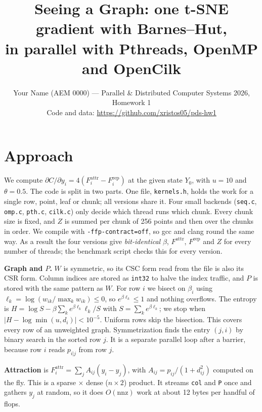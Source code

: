 \documentclass[11pt,a4paper]{article}
\title{\vspace{-1.2cm}Seeing a Graph: one t-SNE gradient with Barnes--Hut,\\in parallel with Pthreads, OpenMP and OpenCilk}
\author{Your Name (AEM 0000) --- Parallel \& Distributed Computer Systems 2026, Homework 1\\
\small Code and data: \url{https://github.com/xristos05/pds-hw1}}
\date{\vspace{-0.9cm}}
\newcommand{\code}[1]{\texttt{#1}}
\begin{document}
\maketitle

\section{Approach}

We compute $\partial C/\partial y_i = 4(F^{\mathrm{attr}}_i - F^{\mathrm{rep}}_i)$ at the given state $Y_0$, with $u=10$ and $\theta=0.5$.
The code is split in two parts. One file, \code{kernels.h}, holds the work for a single row, point, leaf or chunk; all versions share it.
Four small backends (\code{seq.c}, \code{omp.c}, \code{pth.c}, \code{cilk.c}) only decide which thread runs which chunk.
Every chunk size is fixed, and $Z$ is summed per chunk of 256 points and then over the chunks in order.
We compile with \code{-ffp-contract=off}, so gcc and clang round the same way.
As a result the four versions give \emph{bit-identical} $\beta$, $F^{\mathrm{attr}}$, $F^{\mathrm{rep}}$ and $Z$ for every number of threads; the benchmark script checks this for every version.

\textbf{Graph and $P$.} $W$ is symmetric, so its CSC form read from the file is also its CSR form. Column indices are stored as \code{int32} to halve the index traffic, and $P$ is stored with the same pattern as $W$.
For row $i$ we bisect on $\beta_i$ using $\ell_k=\log(w_{ik}/\max_k w_{ik})\le 0$, so $e^{\beta\ell_k}\le1$ and nothing overflows. The entropy is $H=\log S-\beta\sum_k e^{\beta\ell_k}\ell_k/S$ with $S=\sum_k e^{\beta\ell_k}$; we stop when $|H-\log\min(u,d_i)|<10^{-5}$.
Uniform rows skip the bisection. This covers every row of an unweighted graph.
Symmetrization finds the entry $(j,i)$ by binary search in the sorted row $j$. It is a separate parallel loop after a barrier, because row $i$ reads $p_{i|j}$ from row $j$.

\textbf{Attraction} is $F^{\mathrm{attr}}_i=\sum_j A_{ij}(y_i-y_j)$, with $A_{ij}=p_{ij}/(1+d_{ij}^2)$ computed on the fly. This is a sparse $\times$ dense ($n\times2$) product.
It streams \code{col} and \code{P} once and gathers $y_j$ at random, so it does $O(\mathrm{nnz})$ work at about 12 bytes per handful of flops.
\end{document}
